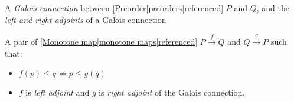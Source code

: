 

A \emph{Galois connection} between \ref{Preorder|preorders|referenced} $P$ and $Q$, and the \emph{left and right adjoints} of a Galois connection

A pair of \ref{Monotone map|monotone maps|referenced} $P \xrightarrow{f} Q$ and $Q \xrightarrow{g} P$ such that:
\begin{itemize}
  \item $f(p) \leq q \iff p \leq g(q)$
  \item $f$ is \emph{left adjoint} and $g$ is \emph{right adjoint} of the Galois connection.
\end{itemize}

